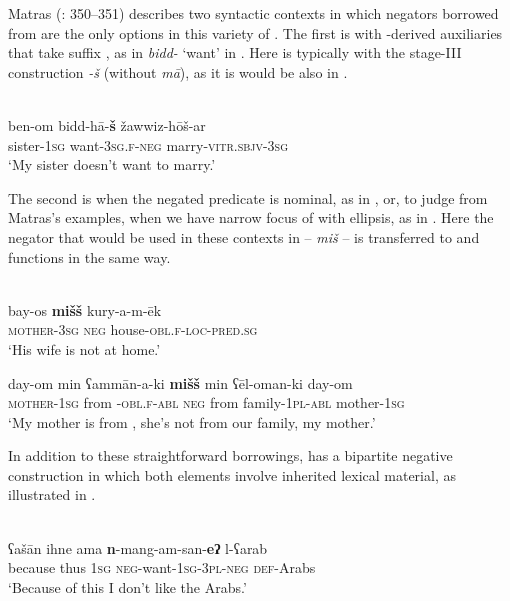 \documentclass[output=paper]{langsci/langscibook}
\begin{document}
Matras (\citeyear{Matras2012}: 350–351) describes two syntactic contexts in which negators borrowed from   are the only options in this variety of . The first is with -derived  auxiliaries that take  suffix , as in \textit{bidd-} ‘want’ in . Here  is typically with the   stage-III construction \textit{{}-š} (without \textit{mā}), as it is would be also in  .


\ea\label{domneg}
{         \citep[351]{Matras2012}}\\
\gll ben-om bidd-hā-\textbf{š} žawwiz-hōš-ar\\
     sister-\textsc{1sg} want\textsc{{}-3sg.f-neg} marry\textsc{-vitr.sbjv-3sg}\\
\glt ‘My sister doesn’t want to marry.’
\z

The second is when the negated predicate is nominal, as in , or, to judge from Matras’s examples, when we have narrow focus of  with ellipsis, as in . Here the negator that would be used in these contexts in  – \textit{miš} – is transferred to  and functions in the same way.

\ea
{  \citep[350]{Matras2012}}\\
\ea\gll bay-os \textbf{mišš} kury-a-m-ēk\label{jer.a}\\
     \textsc{\textup{mother-}}\textsc{3sg} \textsc{neg} house\textsc{-obl.f-loc-pred.sg}  \\
\glt ‘His wife is not at home.’

\ex\gll day-om min ʕammān-a-ki \textbf{mišš} min ʕēl-oman-ki day-om\label{jer.b}\\
     \textsc{\textup{mother-1}}\textsc{sg} from -\textsc{obl.f-abl} \textsc{neg} from family-\textsc{1pl-abl} mother\textsc{-1sg}\\
\glt ‘My mother is from , she’s not from our family, my mother.’
\z
\z

In addition to these straightforward borrowings,  has a bipartite negative construction in which both elements involve inherited lexical material, as illustrated in .

\ea\label{jer.c}
{         \citep[117]{Matras2012}}\\
\gll ʕašān ihne ama \textbf{n}-mang-am-san-\textbf{eʔ} l-ʕarab\\
     because thus \textsc{1sg} \textsc{neg-}want-\textsc{1sg-3pl-neg} \textsc{def-}Arabs\\
\glt ‘Because of this I don’t like the Arabs.’
\z
\end{document}

